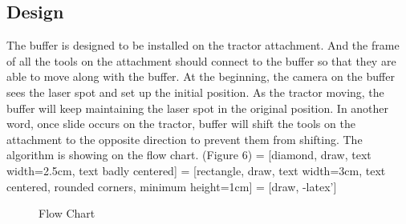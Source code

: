\documentclass[12pt]{article}
\begin{document}
\begin{flushleft}
\section{Design}
The buffer is designed to be installed on the tractor attachment. And the frame of all the tools on the attachment should connect to the buffer so that they are able to move along with the buffer. At the beginning, the camera on the buffer sees the laser spot and set up the initial position. As the tractor moving, the buffer will keep maintaining the laser spot in the original position. In another word, once slide occurs on the tractor, buffer will shift the tools on the attachment to the opposite direction to prevent them from shifting. The algorithm is showing on the flow chart. (Figure 6)
 = [diamond, draw, text width=2.5cm, text badly centered]
 = [rectangle, draw, text width=3cm, text centered, rounded corners, minimum height=1cm]
 = [draw, -latex']
\begin{figure}
	\begin{center}
		\caption{Flow Chart}
	\end{center}
\end{figure}

\end{flushleft}
\end{document}
